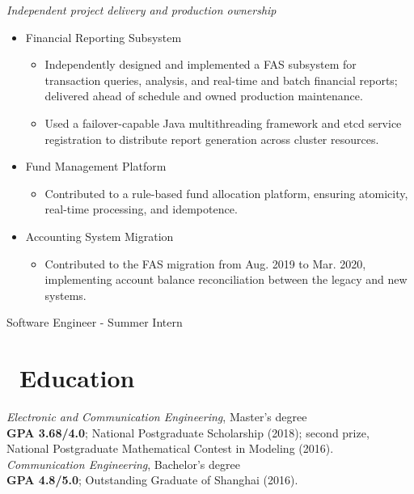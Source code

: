 \documentclass{resume}
\begin{document}
\textit{Independent project delivery and production ownership}
\begin{itemize}
  \item Financial Reporting Subsystem
  \begin{itemize}
    \item[。] Independently designed and implemented a FAS subsystem for transaction queries, analysis, and real-time and batch financial reports; delivered ahead of schedule and owned production maintenance.
    \item[。] Used a failover-capable Java multithreading framework and etcd service registration to distribute report generation across cluster resources.
  \end{itemize}
  \item Fund Management Platform
  \begin{itemize}
    \item[。] Contributed to a rule-based fund allocation platform, ensuring atomicity, real-time processing, and idempotence.
  \end{itemize}
  \item Accounting System Migration
  \begin{itemize}
    \item[。] Contributed to the FAS migration from Aug. 2019 to Mar. 2020, implementing account balance reconciliation between the legacy and new systems.
  \end{itemize}
\end{itemize}

Software Engineer - Summer Intern

\section{\faGraduationCap\ Education}
\textit{Electronic and Communication Engineering}, Master's degree
\\ \textbf{GPA 3.68/4.0}; National Postgraduate Scholarship (2018); second prize, National Postgraduate Mathematical Contest in Modeling (2016).
\textit{Communication Engineering}, Bachelor's degree
\\ \textbf{GPA 4.8/5.0}; Outstanding Graduate of Shanghai (2016).
\end{document}
